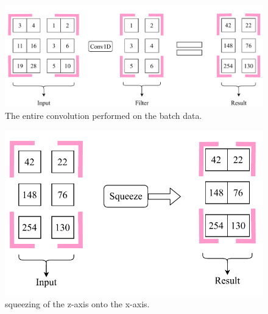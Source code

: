 \documentclass[12pt]{article}
\begin{document}
\newpage
\begin{figure}[!htbp]
\begin{center}
	\includegraphics[width=\textwidth]{secondConvSample_final}
	\begin{center}
		\caption{ The entire convolution performed on the batch data.}
	\end{center}
\end{center}
\end{figure}
\begin{figure}[!htbp]
	\begin{center}
		\includegraphics[width=\textwidth]{squeeze}
		\begin{center}
			\caption{ squeezing of the z-axis onto the x-axis.}
		\end{center}
	\end{center}
\end{figure}
\newpage
\end{document}
